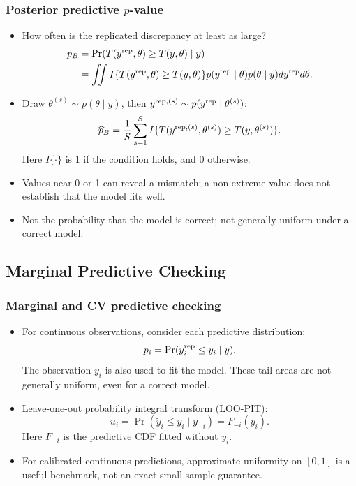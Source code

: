 \documentclass[10pt]{beamer}
\begin{document}
\begin{frame}[fragile]

\frametitle{Posterior predictive $p$-value}

  \begin{itemize}
  \item<1-> How often is the replicated discrepancy at least as large?
    {\small
    \begin{align*}
      p_B &= \Pr(T(y^{\operatorname{\mathrm{rep}}},\theta)\geq T(y,\theta)\mid y)\\
          &= \iint I\{T(y^{\operatorname{\mathrm{rep}}},\theta)\geq T(y,\theta)\}
             p(y^{\operatorname{\mathrm{rep}}}\mid\theta)p(\theta\mid y)dy^{\operatorname{\mathrm{rep}}}d\theta.
    \end{align*}
    }
  \item<2-> Draw $\theta^{(s)}\sim p(\theta\mid y)$, then
    $y^{\operatorname{\mathrm{rep}},(s)}\sim p(y^{\operatorname{\mathrm{rep}}}\mid\theta^{(s)})$:
    \[
      \widehat p_B=\frac{1}{S}\sum_{s=1}^S
      I\{T(y^{\operatorname{\mathrm{rep}},(s)},\theta^{(s)})\geq T(y,\theta^{(s)})\}.
    \]
    Here $I\{\cdot\}$ is 1 if the condition holds, and 0 otherwise.
  \item<3-> Values near 0 or 1 can reveal a mismatch; a non-extreme value
    does not establish that the model fits well.
  \item<4-> Not the probability that the model is correct; not generally
    uniform under a correct model.
  \end{itemize}

\end{frame}

\subsection{Marginal Predictive Checking}
\frame{\subsectionpage}


\begin{frame}[fragile]

\frametitle{Marginal and CV predictive checking}

  \begin{itemize}
  \item For continuous observations, consider each predictive distribution:
    \[
      p_i=\Pr(y_i^{\operatorname{\mathrm{rep}}}\leq y_i\mid y).
    \]
    The observation $y_i$ is also used to fit the model. These tail areas
    are not generally uniform, even for a correct model.
  \item<2-> Leave-one-out probability integral transform (LOO-PIT):
    \[
      u_i=\Pr(\tilde y_i\leq y_i\mid y_{-i})=F_{-i}(y_i).
    \]
    Here $F_{-i}$ is the predictive CDF fitted without $y_i$.
  \item<2-> For calibrated continuous predictions, approximate uniformity
    on $[0,1]$ is a useful benchmark, not an exact small-sample guarantee.
  \end{itemize}

\end{frame}
\end{document}
